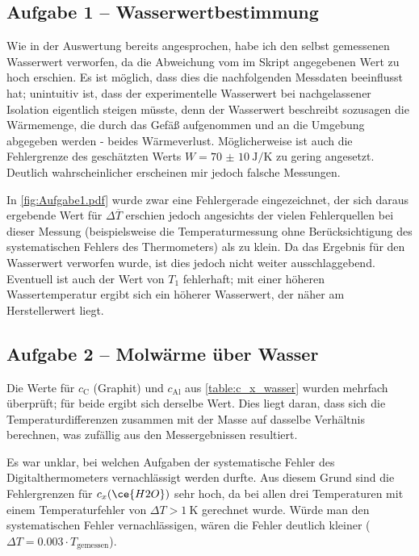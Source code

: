 \subsection{Aufgabe 1 -- Wasserwertbestimmung}
Wie in der Auswertung bereits angesprochen, habe ich den selbst gemessenen Wasserwert verworfen, da die Abweichung vom im Skript angegebenen Wert zu hoch erschien. Es ist möglich, dass dies die nachfolgenden Messdaten beeinflusst hat; unintuitiv ist, dass der experimentelle Wasserwert bei nachgelassener Isolation eigentlich steigen müsste, denn der Wasserwert beschreibt sozusagen die Wärmemenge, die durch das Gefäß aufgenommen und an die Umgebung abgegeben werden - beides Wärmeverlust. Möglicherweise ist auch die Fehlergrenze des geschätzten Werts \(W = \qty{70(10)}{\J\per\K}\) zu gering angesetzt. Deutlich wahrscheinlicher erscheinen mir jedoch falsche Messungen.

In \cref{fig:Aufgabe1.pdf} wurde zwar eine Fehlergerade eingezeichnet, der sich daraus ergebende Wert für \(\Delta \overline{T}\) erschien jedoch angesichts der vielen Fehlerquellen bei dieser Messung (beispielsweise die Temperaturmessung ohne Berücksichtigung des systematischen Fehlers des Thermometers) als zu klein. Da das Ergebnis für den Wasserwert verworfen wurde, ist dies jedoch nicht weiter ausschlaggebend. Eventuell ist auch der Wert von \(T_1\) fehlerhaft; mit einer höheren Wassertemperatur ergibt sich ein höherer Wasserwert, der näher am Herstellerwert liegt.

\subsection{Aufgabe 2 -- Molwärme über Wasser}
Die Werte für \(c_{\text{C}}\) (Graphit) und \(c_{\text{Al}}\) aus \cref{table:c_x_wasser} wurden mehrfach überprüft; für beide ergibt sich derselbe Wert. Dies liegt daran, dass sich die Temperaturdifferenzen zusammen mit der Masse auf dasselbe Verhältnis berechnen, was zufällig aus den Messergebnissen resultiert.\par

Es war unklar, bei welchen Aufgaben der systematische Fehler des Digitalthermometers vernachlässigt werden durfte. Aus diesem Grund sind die Fehlergrenzen für \(c_x(\ce{H2O})\) sehr hoch, da bei allen drei Temperaturen mit einem Temperaturfehler von \(\Delta T > \qty{1}{\K}\) gerechnet wurde. Würde man den systematischen Fehler vernachlässigen, wären die Fehler deutlich kleiner (\(\Delta T = \num{0,003} \cdot T_{\text{gemessen}}\)).

